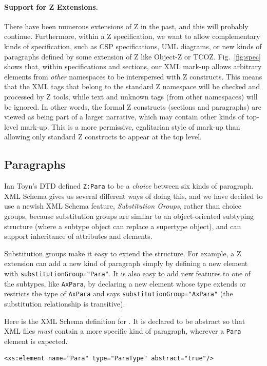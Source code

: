 \documentclass{llncs}  %
\begin{document}
\paragraph{Support for Z Extensions.}
There have been numerous extensions of Z in the past, and this will
probably continue.  Furthermore, within a Z specification, we want
to allow complementary kinds of specification, such as CSP specifications,
UML diagrams, or new kinds of paragraphs defined by some extension of Z
like Object-Z or TCOZ.  
Fig.~\ref{fig:spec} shows that, within specifications and sections, our XML
mark-up allows arbitrary elements from \emph{other} namespaces to be
interspersed with Z constructs.  
This means that the XML tags that belong to the standard Z
namespace will be checked and processed by Z tools, while text and unknown
tags (from other namespaces) will be ignored.  In other words, the formal Z
constructs (sections and paragraphs) are viewed as being part of a
larger narrative, which may contain other kinds of 
top-level mark-up.  This is a more permissive, egalitarian style of
mark-up than allowing only standard Z constructs to appear at the top
level.


\subsection{Paragraphs}

Ian Toyn's DTD defined \verb!Z:Para! to be a \emph{choice} between six
kinds of paragraph.  XML Schema gives us several different ways of doing
this, and we have decided to use a newish XML Schema feature,
\emph{Substitution Groups}, rather than choice groups, because substitution
groups are similar to an object-oriented subtyping structure (where a
subtype object can replace a supertype object), and can support inheritance
of attributes and elements.   

Substitution groups make it easy to extend the structure.  For example, a Z
extension can add a new kind of paragraph simply by defining a new
element with \texttt{substitutionGroup="Para"}.  It is also easy to add new
features to one of the subtypes, like \texttt{AxPara}, by declaring a new
element whose type extends or restricts the type of \texttt{AxPara} and
says \texttt{substitutionGroup="AxPara"} (the substitution relationship is
transitive).

Here is the XML Schema definition for .
It is declared to be abstract so that XML files \emph{must} contain a
more specific kind of paragraph, wherever a \texttt{Para} element is 
expected.
\begin{verbatim}
<xs:element name="Para" type="ParaType" abstract="true"/>
\end{verbatim}
\end{document}

